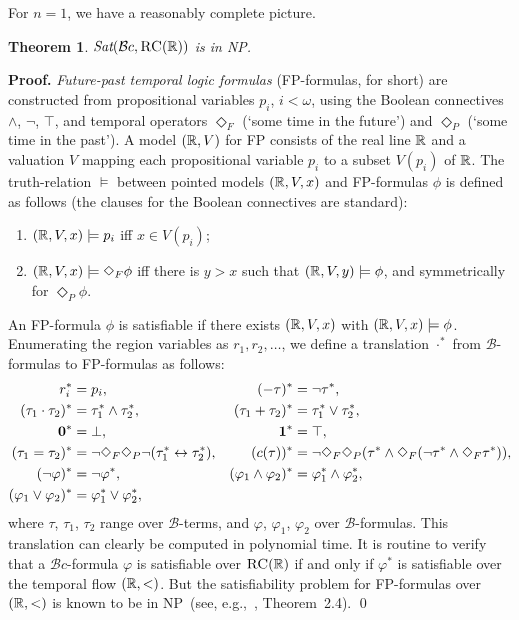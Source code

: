 \documentclass{LMCS}
\renewenvironment{proof}{\par\noindent\textbf{Proof.}}{\mbox{}\qed\par\medskip}
\theoremstyle{plain}
\newtheorem{theorem}[thm]{Theorem}
\newcommand{\cB}{\ensuremath{\mathcal{B}}}\newcommand{\cBc}{\ensuremath{\mathcal{B}c}}\newcommand{\cBcc}{\ensuremath{\mathcal{B}cc}}
\newcommand{\Sat}{\textit{Sat}}
\newcommand{\NP}{\textsc{NP}}
\begin{document}
For $n = 1$, we have a reasonably complete picture.
\begin{theorem}\label{thm:R:NP}
$\Sat(\cBc,\RegC(\R))$ is in \NP{}.
\end{theorem}
\begin{proof}
\emph{Future-past temporal
logic formulas} (FP-formulas, for short) are constructed from
propositional variables $p_i$, $i<\omega$, using the Boolean
connectives $\wedge$, $\neg$, $\top$, and temporal operators
$\Diamond_F$ (`some time in the future') and
$\Diamond_P$ (`some time in the past'). A model $(\mathbb{R},V)$ for FP
consists of the real line $\mathbb{R}$ and a valuation $V$ mapping each
propositional variable $p_i$ to a subset $V(p_i)$ of $\mathbb{R}$. The
truth-relation $\models$ between pointed models $(\mathbb{R},V,x)$ and
FP-formulas $\phi$ is defined as follows (the clauses for the
Boolean connectives are standard):
\begin{enumerate}[$\bullet$]
\item $(\mathbb{R},V,x) \models p_i$ iff $x\in V(p_{i})$;
\item $(\mathbb{R},V,x) \models \Diamond_F \phi$ iff there is $y>x$
    such that $(\mathbb{R},V,y) \models \phi$, and symmetrically for $\Diamond_P \phi$.
\end{enumerate}
An FP-formula $\phi$ is satisfiable if there exists $(\mathbb{R},V,x)$ with
$(\mathbb{R},V,x)\models \phi$. Enumerating the region variables as $r_1,
r_2, \ldots$, we define a translation $\cdot^\ast$ from $\cB$-formulas
to FP-formulas as follows:
\begin{align*}
r^*_i & = p_i, &  (-\tau)^* & = \neg \tau^*, \\
(\tau_1 \cdot \tau_2)^* & = \tau^*_1 \wedge \tau^*_2, &
(\tau_1 + \tau_2)^* & = \tau^*_1 \vee \tau^*_2,\\
\mathbf{0}^* & = \bot, &  \mathbf{1}^* & = \top,\\
(\tau_1 = \tau_2)^* & = \neg \Diamond_F \Diamond_P \neg
(\tau^*_1 \leftrightarrow \tau^*_2), &
(c(\tau))^* & = \neg \Diamond_F \Diamond_P(\tau^* \wedge \Diamond_F
(\neg \tau^* \wedge \Diamond_F \tau^*)),\\
(\neg \varphi)^* &= \neg \varphi^*, &
(\varphi_1 \wedge  \varphi_2)^* & = \varphi^*_1 \wedge  \varphi^*_2,\\
(\varphi_1 \vee  \varphi_2)^* & = \varphi^*_1 \vee  \varphi^*_2,
\end{align*}
where $\tau$, $\tau_1$, $\tau_2$ range over $\cB$-terms, and
$\varphi$, $\varphi_1$, $\varphi_2$ over $\cB$-formulas.  This
translation can clearly be computed in polynomial time. It is routine
to verify that a $\cBc$-formula $\varphi$ is satisfiable over
$\textsc{RC}(\mathbb{R})$ if and only if $\varphi^*$ is satisfiable over the
temporal flow $(\mathbb{R}, <)$. But the satisfiability problem for FP-formulas over
$(\mathbb{R}, <)$ is known to be in \NP~(see, e.g.,~\cite{KK:gkwz},
Theorem~2.4).
\end{proof}
\end{document}
